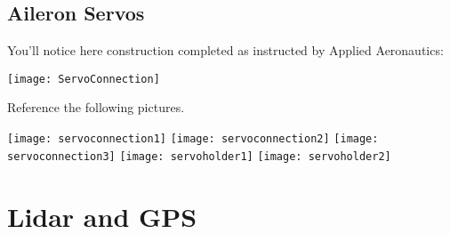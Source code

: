 \documentclass{article}
\begin{document}
\subsection{Aileron Servos}
You'll notice here construction completed as instructed by Applied Aeronautics: \newline

\begin{center}
\texttt{[image: ServoConnection]}
\end{center}

   
   Reference the following pictures.
   \newline
   
   \begin{center}
   \texttt{[image: servoconnection1]} \newline
   \texttt{[image: servoconnection2]} \newline
   \texttt{[image: servoconnection3]} \newline
   \texttt{[image: servoholder1]} \newline
   \texttt{[image: servoholder2]}\newline
   \end{center}
\clearpage

\section{Lidar and GPS}
\end{document}

